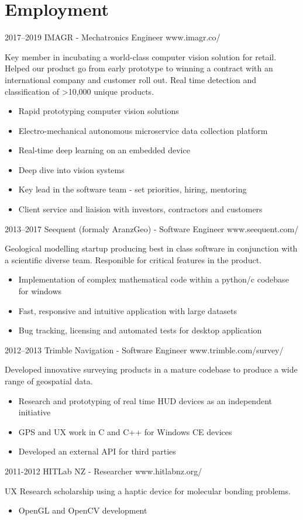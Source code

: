 \documentclass[print]{friggeri-cv} %
\begin{document}
\section{Employment}
\begin{entrylist}
\entry
{2017--2019}
{IMAGR - Mechatronics Engineer}
{www.imagr.co/}
{Key member in incubating a world-class computer vision solution for retail. Helped our product go from early prototype to winning a contract with an international company and customer roll out. Real time detection and classification of >10,000 unique products.
\begin{itemize}
\item Rapid prototyping computer vision solutions
\item Electro-mechanical autonomous microservice data collection platform
\item Real-time deep learning on an embedded device
\item Deep dive into vision systems
\item Key lead in the software team - set priorities, hiring, mentoring
\item Client service and liaision with investors, contractors and customers
\end{itemize}}

\entry
{2013--2017}
{Seequent (formaly AranzGeo) - Software Engineer}
{www.seequent.com/}
{Geological modelling startup producing best in class software in conjunction with a scientific diverse team. Responible for critical features in the product.
\begin{itemize}
\item Implementation of complex mathematical code within a python/c codebase for windows
\item Fast, responsive and intuitive application with large datasets
\item Bug tracking, licensing and automated tests for desktop application
\end{itemize}}

\entry
{2012--2013}
{Trimble Navigation - Software Engineer}
{www.trimble.com/survey/}
{Developed innovative surveying products in a mature codebase to produce a wide range of geospatial data.
\begin{itemize}
\item Research and prototyping of real time HUD devices as an independent initiative
\item GPS and UX work in C and C++ for Windows CE devices
\item Developed an external API for third parties
\end{itemize}}

\entry
{2011-2012}
{HITLab NZ - Researcher}
{www.hitlabnz.org/}
{UX Research scholarship using a haptic device for molecular bonding problems.
\begin{itemize}
\item OpenGL and OpenCV development
\end{itemize}}
\end{entrylist}\\ 
\end{document}
